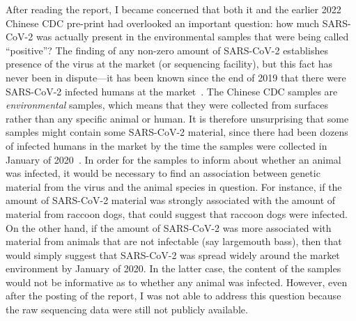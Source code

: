 \documentclass[9pt,twocolumn,twoside]{gsajnl_modified}
\begin{document}
After reading the \citet{crits2023genetic} report, I became concerned that both it and the earlier 2022 Chinese CDC pre-print had overlooked an important question: how much SARS-CoV-2 was actually present in the environmental samples that were being called ``positive''?
The finding of any non-zero amount of SARS-CoV-2 establishes presence of the virus at the market (or sequencing facility), but this fact has never been in dispute---it has been known since the end of 2019 that there were SARS-CoV-2 infected humans at the market~\citep{ProMED2109}.
The Chinese CDC samples are \textit{environmental} samples, which means that they were collected from surfaces rather than any specific animal or human.
It is therefore unsurprising that some samples might contain some SARS-CoV-2 material, since there had been dozens of infected humans in the market by the time the samples were collected in January of 2020~\citep{huang2020clinical}.
In order for the samples to inform about whether an animal was infected, it would be necessary to find an association between genetic material from the virus and the animal species in question.
For instance, if the amount of SARS-CoV-2 material was strongly associated with the amount of material from raccoon dogs, that could suggest that raccoon dogs were infected.
On the other hand, if the amount of SARS-CoV-2 was more associated with material from animals that are not infectable (say largemouth bass), then that would simply suggest that SARS-CoV-2 was spread widely around the market environment by January of 2020.
In the latter case, the content of the samples would not be informative as to whether any animal was infected.
However, even after the posting of the \citet{crits2023genetic} report, I was not able to address this question because the raw sequencing data were still not publicly available.
\end{document}
